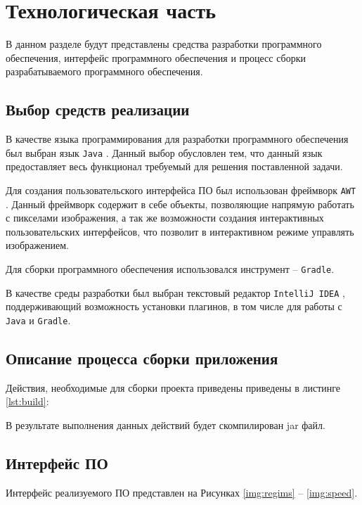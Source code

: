 \chapter{Технологическая часть}

В данном разделе будут представлены средства разработки программного обеспечения, интерфейс программного обеспечения и процесс сборки разрабатываемого программного обеспечения.

\section{Выбор средств реализации}

В качестве языка программирования для разработки программного обеспечения был выбран язык \texttt{Java} \cite{cpp}. Данный выбор обусловлен тем, что данный язык предоставляет весь функционал требуемый для решения поставленной задачи.

Для создания пользовательского интерфейса ПО был использован фреймворк \texttt{AWT} \cite{qt}. Данный фреймворк содержит в себе объекты, позволяющие напрямую работать с пикселами изображения, а  так же возможности создания интерактивных пользовательских интерфейсов, что позволит в интерактивном режиме управлять изображением.

Для сборки программного обеспечения использовался инструмент -- \texttt{Gradle}.

В качестве среды разработки был выбран текстовый редактор \texttt{IntelliJ IDEA} \cite{vscode}, поддерживающий возможность установки плагинов, в том числе для работы с \texttt{Java} и \texttt{Gradle}.


\section{Описание процесса сборки приложения}

Действия, необходимые для сборки проекта приведены приведены в листинге \ref{lst:build}:


В результате выполнения данных действий будет скомпилирован jar файл.  



\clearpage
\section{Интерфейс ПО}

Интерфейс реализуемого ПО представлен на Рисунках \ref{img:regims} -- \ref{img:speed}.

